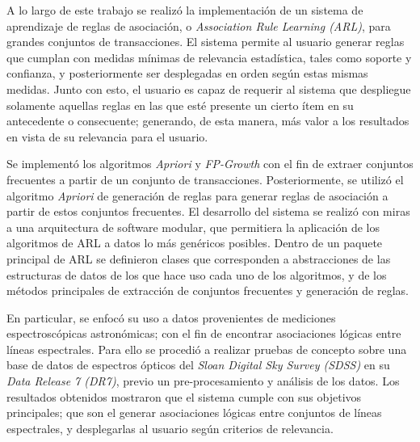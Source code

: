 \begin{conclusion}


A lo largo de este trabajo se realizó la implementación de un sistema de aprendizaje de reglas de asociación, o \textit{Association Rule Learning (ARL)}, para grandes conjuntos de transacciones. El sistema permite al usuario generar reglas que cumplan con medidas mínimas de relevancia estadística, tales como soporte y confianza, y posteriormente ser desplegadas en orden según estas mismas medidas. Junto con esto, el usuario es capaz de requerir al sistema que despliegue solamente aquellas reglas en las que esté presente un cierto ítem en su antecedente o consecuente; generando, de esta manera, más valor a los resultados en vista de su relevancia para el usuario.

Se implementó los algoritmos \textit{Apriori} y \textit{FP-Growth} con el fin de extraer conjuntos frecuentes a partir de un conjunto de transacciones. Posteriormente, se utilizó el algoritmo \textit{Apriori} de generación de reglas para generar reglas de asociación a partir de estos conjuntos frecuentes. El desarrollo del sistema se realizó con miras a una arquitectura de software modular, que permitiera la aplicación de los algoritmos de ARL a datos lo más genéricos posibles. Dentro de un paquete principal de ARL se definieron clases que corresponden a abstracciones de las estructuras de datos de los que hace uso cada uno de los algoritmos, y de los métodos principales de extracción de conjuntos frecuentes y generación de reglas.

En particular, se enfocó su uso a datos provenientes de mediciones espectroscópicas astronómicas; con el fin de encontrar asociaciones lógicas entre líneas espectrales. Para ello se procedió a realizar pruebas de concepto sobre una base de datos de espectros ópticos del \textit{Sloan Digital Sky Survey (SDSS)} en su \textit{Data Release 7 (DR7)}, previo un pre-procesamiento y análisis de los datos. Los resultados obtenidos mostraron que el sistema cumple con sus objetivos principales; que son el generar asociaciones lógicas entre conjuntos de líneas espectrales, y desplegarlas al usuario según criterios de relevancia.


\end{conclusion}
